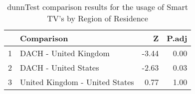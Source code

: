 \begin{table}[ht]
\centering
\begin{tabular}{rlrr}
  \hline
 & Comparison & Z & P.adj \\ 
  \hline
1 & DACH - United Kingdom & -3.44 & 0.00 \\ 
  2 & DACH - United States & -2.63 & 0.03 \\ 
  3 & United Kingdom - United States & 0.77 & 1.00 \\ 
   \hline
\end{tabular}
\caption{dunnTest comparison results for the usage of Smart TV's by Region of Residence} 
\end{table}
